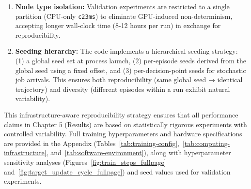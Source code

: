 \begin{enumerate}
    \item \textbf{Node type isolation:} Validation experiments are restricted to a single partition (CPU-only \texttt{c23ms}) to eliminate GPU-induced non-determinism, accepting longer wall-clock time (8-12 hours per run) in exchange for reproducibility.
    
    \item \textbf{Seeding hierarchy:} The code implements a hierarchical seeding strategy: (1) a global seed set at process launch, (2) per-episode seeds derived from the global seed using a fixed offset, and (3) per-decision-point seeds for stochastic job arrivals. This ensures both reproducibility (same global seed → identical trajectory) and diversity (different episodes within a run exhibit natural variability).
\end{enumerate}

This infrastructure-aware reproducibility strategy ensures that all performance claims in Chapter 5 (Results) are based on statistically rigorous experiments with controlled variability. Full training hyperparameters and hardware specifications are provided in the Appendix (Tables~\ref{tab:training-config},~\ref{tab:computing-infrastructure}, and~\ref{tab:software-environment}), along with hyperparameter sensitivity analyses (Figures~\ref{fig:train_steps_fullpage} and~\ref{fig:target_update_cycle_fullpage}) and seed values used for validation experiments.
